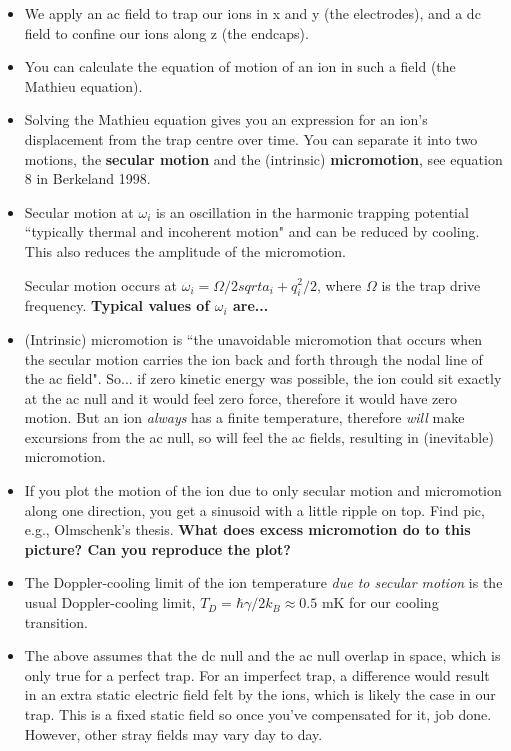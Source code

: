 \documentclass{article}
\begin{document}
\begin{itemize}
\item We apply an ac field to trap our ions in x and y (the electrodes), and a dc field to confine our ions along z (the endcaps).

\item You can calculate the equation of motion of an ion in such a field (the Mathieu equation).

\item Solving the Mathieu equation gives you an expression for an ion's displacement from the trap centre over time. You can separate it into two motions, the \textbf{secular motion} and the (intrinsic) \textbf{micromotion}, see equation 8 in Berkeland 1998. 

\item Secular motion at $\omega_i$ is an oscillation in the harmonic trapping potential ``typically thermal and incoherent motion" and can be reduced by cooling. This also reduces the amplitude of the micromotion.

Secular motion occurs at $\omega_i = \Omega /2 sqrt{a_i + q_i^2 / 2}$, where $\Omega$ is the trap drive frequency. \textbf{Typical values of $\omega_i$ are...}

\item (Intrinsic) micromotion is ``the unavoidable micromotion that occurs when the secular motion carries the ion back and forth through the nodal line of the ac field". So... if zero kinetic energy was possible, the ion could sit exactly at the ac null and it would feel zero force, therefore it would have zero motion. But an ion \textit{always} has a finite temperature, therefore \textit{will} make excursions from the ac null, so will feel the ac fields, resulting in (inevitable) micromotion.

\item If you plot the motion of the ion due to only secular motion and micromotion along one direction, you get a sinusoid with a little ripple on top. Find pic, e.g., Olmschenk's thesis. \textbf{What does excess micromotion do to this picture? Can you reproduce the plot?}

\item The Doppler-cooling limit of the ion temperature \textit{due to secular motion} is the usual Doppler-cooling limit, $T_D = \hbar \gamma / 2 k_B \approx 0.5$ mK for our cooling transition.

\item The above assumes that the dc null and the ac null overlap in space, which is only true for a perfect trap. For an imperfect trap, a difference would result in an extra static electric field felt by the ions, which is likely the case in our trap. This is a fixed static field so once you've compensated for it, job done. However, other stray fields may vary day to day.


\end{itemize}
\end{document}

